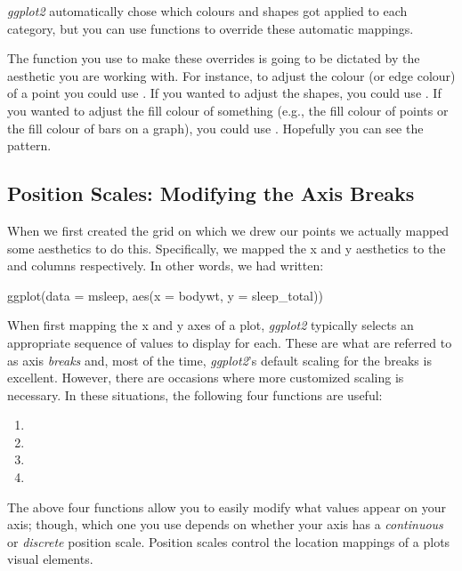 \noindent
\textit{ggplot2} automatically chose which colours and shapes got applied to each category, but you can use functions to override these automatic mappings. 

The function you use to make these overrides is going to be dictated by the aesthetic you are working with. For instance, to adjust the colour (or edge colour) of a point you could use . If you wanted to adjust the shapes, you could use . If you wanted to adjust the fill colour of something (e.g., the fill colour of points or the fill colour of bars on a graph), you could use . Hopefully you can see the pattern.

\subsection{Position Scales: Modifying the Axis Breaks}
\label{sec:pos_scale}

When we first created the grid on which we drew our points we actually mapped some aesthetics to do this. Specifically, we mapped the x and y aesthetics to the  and  columns respectively. In other words, we had written:

\begin{inR}
ggplot(data = msleep, aes(x = bodywt, y = sleep_total))
\end{inR}

\vspace{1em}

When first mapping the x and y axes of a plot, \textit{ggplot2} typically selects an appropriate sequence of values to display for each. These are what are referred to as axis \textit{breaks} and, most of the time, \textit{ggplot2}'s default scaling for the breaks is excellent. However, there are occasions where more customized scaling is necessary. In these situations, the following four functions are useful:

\begin{enumerate}
\setlength\itemsep{-1em}
    \item {}
    \item {}
    \item {}
    \item {}
\end{enumerate}

\noindent
The above four functions allow you to easily modify what values appear on your axis; though, which one you use depends on whether your axis has a \textit{continuous} or \textit{discrete} \gls{position scale}. Position scales control the location mappings of a plots visual elements.

